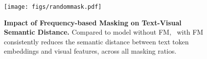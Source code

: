 \begin{figure}[t]
\vspace{-10pt}
    \centering   \texttt{[image: figs/randommask.pdf]} 
    \vspace{-20pt}
\caption{\textbf{Impact of Frequency-based Masking on Text-Visual Semantic Distance.} Compared to model without FM, \ourname\ with FM consistently reduces the semantic distance between text token embeddings and visual features, across all masking ratios.}
\label{fig:random_mask}
\vspace{-19pt}    
\end{figure}
